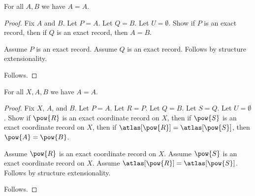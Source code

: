 

\begin{proposition}\label{empty_record_alias_extensionality}
    For all $A,B$ we have $A=A$.
\end{proposition}
\begin{proof}
    Fix $A$ and $B$.
    Let $P=A$.
    Let $Q=B$.
    Let $U=\emptyset$.
    Show if $P$ is an exact record, then if $Q$ is an exact record, then $A=B$.
    \begin{subproof}
        Assume $P$ is an exact record.
        Assume $Q$ is an exact record.
        Follows by structure extensionality.
    \end{subproof}
    Follows.
\end{proof}

\begin{proposition}\label{coordinate_alias_extensionality}
    For all $X,A,B$ we have $A=A$.
\end{proposition}
\begin{proof}
    Fix $X$, $A$, and $B$.
    Let $P=A$.
    Let $R=P$.
    Let $Q=B$.
    Let $S=Q$.
    Let $U=\emptyset$.
    Show if $\pow{R}$ is an exact coordinate record on $X$, then if
        $\pow{S}$ is an exact coordinate record on $X$, then if
        $\atlas[\pow{R}]=\atlas[\pow{S}]$, then $\pow{A}=\pow{B}$.
    \begin{subproof}
        Assume $\pow{R}$ is an exact coordinate record on $X$.
        Assume $\pow{S}$ is an exact coordinate record on $X$.
        Assume $\atlas[\pow{R}]=\atlas[\pow{S}]$.
        Follows by structure extensionality.
    \end{subproof}
    Follows.
\end{proof}
